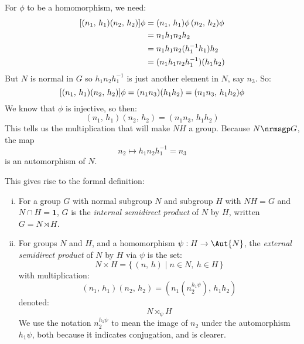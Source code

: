 For \(\phi\) to be a homomorphism, we need:
\begin{equation*}
\begin{aligned}
    \relax[(n_1,\,h_1)(n_2,\,h_2)]\phi &= (n_1,\,h_1)\phi\,(n_2,\,h_2)\phi \\
    &= n_1 h_1 n_2 h_2 \\
    &= n_1 h_1 n_2 (h_1^{-1} h_1) h_2 \\
    &= (n_1 h_1 n_2 h_1^{-1})(h_1 h_2)
\end{aligned}
\end{equation*}
But \(N\) is normal in \(G\) so \(h_1 n_2 h_1^{-1}\) is just another element in \(N\), say \(n_3\).
So:
\[\relax[(n_1,\,h_1)(n_2,\,h_2)]\phi = (n_1 n_3)(h_1 h_2) = (n_1 n_3,\,h_1 h_2)\phi\]
We know that \(\phi\) is injective, so then:
\[(n_1,\,h_1)(n_2,\,h_2) = (n_1 n_3,\,h_1 h_2) \tag{\(\dagger\)}\]
This tells us the multiplication that will make \(NH\) a group.
Because \(N \nrmsgp G\), the map
\[n_2 \mapsto h_1 n_2 h_1^{-1} = n_3\]
is an automorphism of \(N\).

This gives rise to the formal definition:

\begin{definition}
\raggedright
\mbox{}
\begin{enumerate}[(i)]
    \item

        For a group \(G\) with normal subgroup \(N\) and subgroup \(H\) with \(NH = G\) and \(N \cap H = \bm{1}\),
        \(G\) is the \emph{internal semidirect product} of \(N\) by \(H\), written \(G = N \rtimes H\).
    \item

        For groups \(N\) and \(H\), and a homomorphism \(\psi:H \to \Aut{N}\), the \emph{external semidirect product} of
        \(N\) by \(H\) via \(\psi\) is the set:
        \[N \times H = \{\,(n,\,h) \mid n \in N,\ h \in H\,\}\]
        with multiplication:
        \[(n_1,\,h_1)(n_2,\,h_2) = (n_1(n_2^{h_1\psi}),\,h_1 h_2)\]
        denoted:
        \[N \rtimes_{\psi} H\]
        We use the notation \(n_2^{h_1\psi}\) to mean the image of \(n_2\) under the automorphism \(h_1\psi\), both
        because it indicates conjugation, and is clearer.
\end{enumerate}
\end{definition}

